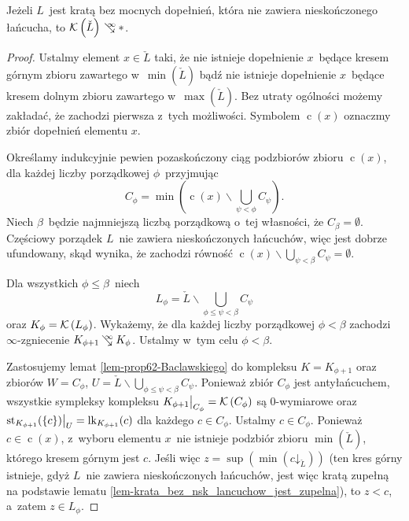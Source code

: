 \begin{tw}\label{tw-baclawskiego-o-kratach-bez-mocnych-dopelnien}
Jeżeli $L$~jest kratą bez mocnych dopełnień, która nie zawiera nieskończonego łańcucha, to $\mK\left(\check{L}\right)\infcoll *$.
\end{tw}
\begin{proof}
Ustalmy element $x\in \check{L}$ taki, że  nie istnieje dopełnienie $x$~będące kresem górnym zbioru zawartego w~$\min\left(\check{L}\right)$ bądź nie istnieje dopełnienie $x$~będące kresem dolnym zbioru zawartego w~$\max\left(\check{L}\right)$. Bez utraty ogólności możemy zakładać, że zachodzi pierwsza z~tych możliwości.
Symbolem $\operatorname{c}(x)$ oznaczmy zbiór dopełnień elementu $x$.

Określamy indukcyjnie pewien pozaskończony ciąg podzbiorów zbioru $\operatorname{c}(x)$, dla każdej liczby porządkowej $\phi$~przyjmując \[C_\phi=\min\left(\operatorname{c}(x)\smallsetminus \bigcup_{\psi<\phi}C_\psi\right).\] Niech $\beta$~będzie najmniejszą liczbą porządkową o~tej własności, że $C_\beta=\emptyset$. Częściowy porządek $L$~nie zawiera nieskończonych łańcuchów, więc jest dobrze ufundowany, skąd wynika, że zachodzi równość $\operatorname{c}(x)\smallsetminus \bigcup_{\psi<\beta}C_\psi=\emptyset$.

Dla wszystkich $\phi\leq\beta$~niech \[
L_\phi=\check{L}\smallsetminus \bigcup_{\phi\leq \psi<\beta} C_\psi\] oraz $K_\phi=\mathcal{K}\left(L_\phi\right)$.
Wykażemy, że dla każdej liczby porządkowej $\phi<\beta$ zachodzi \mbox{$\infty$-zgniecenie} $K_{\phi+1}\infcoll K_{\phi}$. Ustalmy w~tym celu $\phi<\beta$.

Zastosujemy lemat \ref{lem-prop62-Baclawskiego} do kompleksu $K=K_{\phi+1}$ oraz zbiorów $W=C_\phi$, $U=\check{L}\smallsetminus \bigcup_{\phi\leq \psi<\beta} C_\psi$. Ponieważ zbiór $C_\phi$ jest antyłańcuchem, wszystkie sympleksy kompleksu $K_{\phi+1}\big|_{C_\phi}=\mathcal{K}\left(C_\phi\right)$ są $0$-wymiarowe oraz $\operatorname{st}_{K_{\phi+1}}(\{c\})\big|_U=\operatorname{lk}_{K_{\phi+1}}(c)$ dla każdego $c\in C_{\phi}$. Ustalmy $c\in C_{\phi}$. Ponieważ $c\in\operatorname{c}(x)$, z~wyboru elementu $x$~nie istnieje podzbiór zbioru $\min\left(\check{L}\right)$, którego kresem górnym jest $c$. Jeśli więc $z=\sup\left(\min\left(c\mathord{\downarrow}_{\check{L}}\right)\right)$ (ten kres górny istnieje, gdyż $L$~nie zawiera nieskończonych łańcuchów, jest więc kratą zupełną na podstawie lematu \ref{lem-krata_bez_nsk_lancuchow_jest_zupelna}), to $z<c$, a~zatem $z\in L_{\phi}$.


\end{proof}
